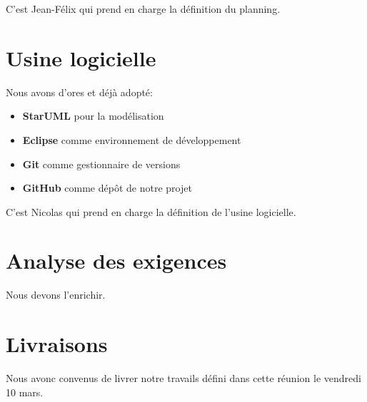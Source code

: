 \documentclass[11pt,a4paper,french,twoside,openright]{article}
\begin{document}
C'est Jean-Félix qui prend en charge la définition du planning.

\section{Usine logicielle}
Nous avons d'ores et déjà adopté:
\begin{itemize}
\item \textbf{StarUML} pour la modélisation
\item \textbf{Eclipse} comme environnement de développement
\item \textbf{Git} comme gestionnaire de versions
\item \textbf{GitHub} comme dépôt de notre projet
\end{itemize}
C'est Nicolas qui prend en charge la définition de l'usine logicielle.

\section{Analyse des exigences}
Nous devons l'enrichir.

\section{Livraisons}
Nous avonc convenus de livrer notre travails défini dans cette réunion le vendredi 10 mars.

\label{LastPage}
\end{document}
